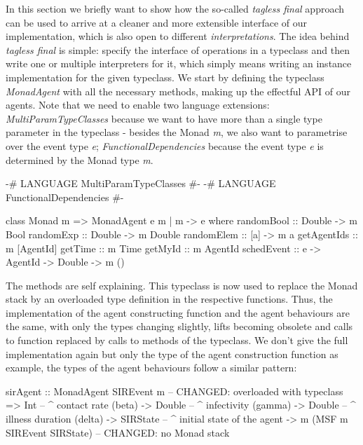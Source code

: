\medskip

In this section we briefly want to show how the so-called \textit{tagless final} approach \cite{kiselyov_typed_2012} can be used to arrive at a cleaner and more extensible interface of our implementation, which is also open to different \textit{interpretations}. The idea behind \textit{tagless final} is simple: specify the interface of operations in a typeclass and then write one or multiple interpreters for it, which simply means writing an instance implementation for the given typeclass. We start by defining the typeclass \textit{MonadAgent} with all the necessary methods, making up the effectful API of our agents. Note that we need to enable two language extensions: \textit{MultiParamTypeClasses} because we want to have more than a single type parameter in the typeclass - besides the Monad \textit{m}, we also want to parametrise over the event type \textit{e}; \textit{FunctionalDependencies} because the event type \textit{e} is determined by the Monad type \textit{m}.

\begin{HaskellCode}
{-# LANGUAGE MultiParamTypeClasses  #-}
{-# LANGUAGE FunctionalDependencies #-}

class Monad m => MonadAgent e m | m -> e where
  randomBool  :: Double -> m Bool
  randomExp   :: Double -> m Double
  randomElem  :: [a] -> m a
  getAgentIds :: m [AgentId]
  getTime     :: m Time
  getMyId     :: m AgentId
  schedEvent  :: e -> AgentId -> Double -> m ()
\end{HaskellCode}

The methods are self explaining. This typeclass is now used to replace the Monad stack by an overloaded type definition in the respective functions. Thus, the implementation of the agent constructing function and the agent behaviours are the same, with only the types changing slightly, lifts becoming obsolete and calls to function replaced by calls to methods of the typeclass. We don't give the full implementation again but only the type of the agent construction function as example, the types of the agent behaviours follow a similar pattern: 

\begin{HaskellCode}
sirAgent :: MonadAgent SIREvent m  -- CHANGED: overloaded with typeclass
         => Int         -- ^ contact rate (beta)
         -> Double      -- ^ infectivity (gamma)
         -> Double      -- ^ illness duration (delta)
         -> SIRState    -- ^ initial state of the agent
         -> m (MSF m SIREvent SIRState) -- CHANGED: no Monad stack
\end{HaskellCode}

